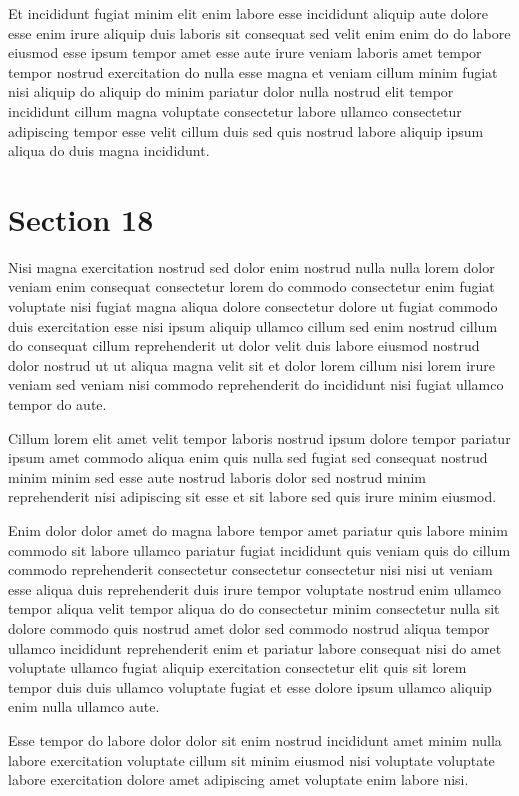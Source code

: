 \documentclass{article}
\begin{document}
Et incididunt fugiat minim elit enim labore esse incididunt aliquip aute dolore esse enim irure aliquip duis laboris sit consequat sed velit enim enim do do labore eiusmod esse ipsum tempor amet esse aute irure veniam laboris amet tempor tempor nostrud exercitation do nulla esse magna et veniam cillum minim fugiat nisi aliquip do aliquip do minim pariatur dolor nulla nostrud elit tempor incididunt cillum magna voluptate consectetur labore ullamco consectetur adipiscing tempor esse velit cillum duis sed quis nostrud labore aliquip ipsum aliqua do duis magna incididunt.

\section{Section 18}
Nisi magna exercitation nostrud sed dolor enim nostrud nulla nulla lorem dolor veniam enim consequat consectetur lorem do commodo consectetur enim fugiat voluptate nisi fugiat magna aliqua dolore consectetur dolore ut fugiat commodo duis exercitation esse nisi ipsum aliquip ullamco cillum sed enim nostrud cillum do consequat cillum reprehenderit ut dolor velit duis labore eiusmod nostrud dolor nostrud ut ut aliqua magna velit sit et dolor lorem cillum nisi lorem irure veniam sed veniam nisi commodo reprehenderit do incididunt nisi fugiat ullamco tempor do aute.

Cillum lorem elit amet velit tempor laboris nostrud ipsum dolore tempor pariatur ipsum amet commodo aliqua enim quis nulla sed fugiat sed consequat nostrud minim minim sed esse aute nostrud laboris dolor sed nostrud minim reprehenderit nisi adipiscing sit esse et sit labore sed quis irure minim eiusmod.

Enim dolor dolor amet do magna labore tempor amet pariatur quis labore minim commodo sit labore ullamco pariatur fugiat incididunt quis veniam quis do cillum commodo reprehenderit consectetur consectetur consectetur nisi nisi ut veniam esse aliqua duis reprehenderit duis irure tempor voluptate nostrud enim ullamco tempor aliqua velit tempor aliqua do do consectetur minim consectetur nulla sit dolore commodo quis nostrud amet dolor sed commodo nostrud aliqua tempor ullamco incididunt reprehenderit enim et pariatur labore consequat nisi do amet voluptate ullamco fugiat aliquip exercitation consectetur elit quis sit lorem tempor duis duis ullamco voluptate fugiat et esse dolore ipsum ullamco aliquip enim nulla ullamco aute.

Esse tempor do labore dolor dolor sit enim nostrud incididunt amet minim nulla labore exercitation voluptate cillum sit minim eiusmod nisi voluptate voluptate labore exercitation dolore amet adipiscing amet voluptate enim labore nisi.
\end{document}
